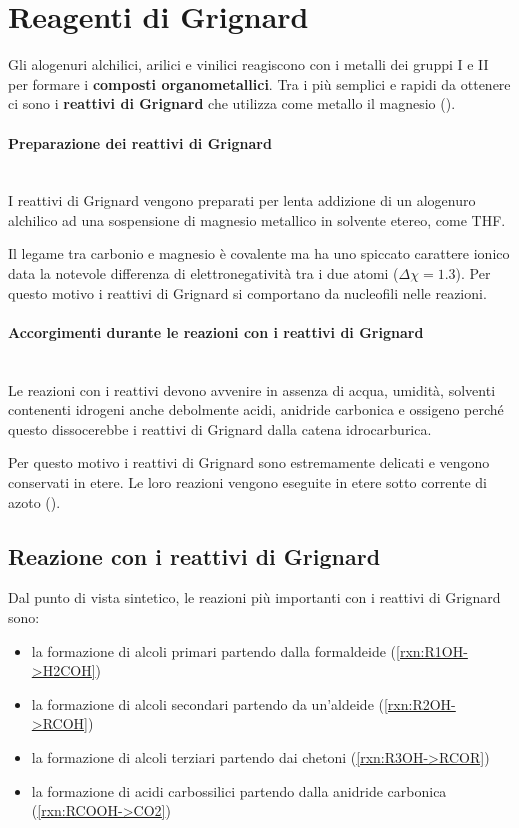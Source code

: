 \section{Reagenti di Grignard}
Gli alogenuri alchilici, arilici e vinilici reagiscono con i metalli dei gruppi I e II per formare i \textbf{composti organometallici}. Tra i più semplici e rapidi da ottenere ci sono i \textbf{reattivi di Grignard} che utilizza come metallo il magnesio ().

\paragraph{Preparazione dei reattivi di Grignard}\mbox{}\\
I reattivi di Grignard vengono preparati per lenta addizione di un alogenuro alchilico ad una sospensione di magnesio metallico in solvente etereo, come \ac{THF}.

Il legame tra carbonio e magnesio è covalente ma ha uno spiccato carattere ionico data la notevole differenza di elettronegatività tra i due atomi (\(\Delta \chi = 1.3\)). Per questo motivo i reattivi di Grignard si comportano da nucleofili nelle reazioni.

\paragraph{Accorgimenti durante le reazioni con i reattivi di Grignard}\mbox{}\\
Le reazioni con i reattivi devono avvenire in assenza di acqua, umidità, solventi contenenti idrogeni anche debolmente acidi, anidride carbonica e ossigeno perché questo dissocerebbe i reattivi di Grignard dalla catena idrocarburica.
\begingroup
\begin{reaction}
	 \+  \arrow {} \+  \+  \+ 
\end{reaction}
\endgroup
Per questo motivo i reattivi di Grignard sono estremamente delicati e vengono conservati in etere. Le loro reazioni vengono eseguite in etere sotto corrente di azoto ().

\subsection{Reazione con i reattivi di Grignard}
\noindent Dal punto di vista sintetico, le reazioni più importanti con i reattivi di Grignard sono:
\begin{itemize}
	\item la formazione di alcoli primari partendo dalla formaldeide (\autoref{rxn:R1OH->H2COH})
	\item la formazione di alcoli secondari partendo da un'aldeide (\autoref{rxn:R2OH->RCOH})
	\item la formazione di alcoli terziari partendo dai chetoni (\autoref{rxn:R3OH->RCOR})
	\item la formazione di acidi carbossilici partendo dalla anidride carbonica (\autoref{rxn:RCOOH->CO2})
\end{itemize}

